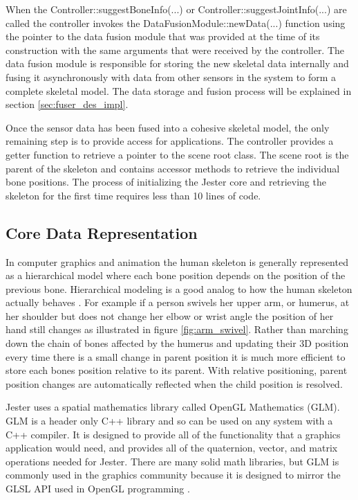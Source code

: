 When the Controller::suggestBoneInfo(...) or Controller::suggestJointInfo(...) are called the controller invokes the DataFusionModule::newData(...) function using the pointer to the data fusion module that was provided at the time of its construction with the same arguments that were received by the controller. The  data fusion module is responsible for storing the new skeletal data internally and fusing it asynchronously with data from other sensors in the system to form a complete skeletal model. The data storage and fusion process will be explained in section \ref{sec:fuser_des_impl}.

Once the sensor data has been fused into a cohesive skeletal model, the only remaining step is to provide access for applications. The controller provides a getter function to retrieve a pointer to the scene root class. The scene root is the parent of the skeleton and contains accessor methods to retrieve the individual bone positions. The process of initializing the Jester core and retrieving the skeleton for the first time requires less than 10 lines of code.

\subsection{Core Data Representation}

In computer graphics and animation the human skeleton is generally represented as a hierarchical model where each bone position depends on the position of the previous bone. Hierarchical modeling is a good analog to how the human skeleton actually behaves \cite{parent2012computer}. For example if a person swivels her upper arm, or humerus, at her shoulder but does not change her elbow or wrist angle the position of her hand still changes as illustrated in figure \ref{fig:arm_swivel}. Rather than marching down the chain of bones affected by the humerus and updating their 3D position every time there is a small change in parent position it is much more efficient to store each bones position relative to its parent. With relative positioning, parent position changes are automatically reflected when the child position is resolved.

Jester uses a spatial mathematics library called OpenGL Mathematics (GLM). GLM is a header only C++ library and so can be used on any system with a C++ compiler. It is designed to provide all of the functionality that a graphics application would need, and provides all of the quaternion, vector, and matrix operations needed for Jester. There are many solid math libraries, but GLM is commonly used in the graphics community because it is designed to mirror the GLSL API used in OpenGL programming \cite{glm}.

